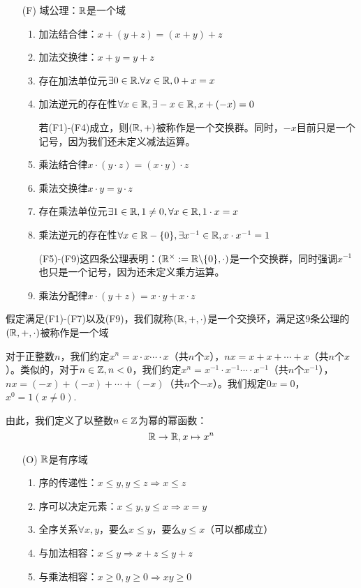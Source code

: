 \begin{itemize}
    \item[(F)] 域公理：$\mathbb{R}$是一个域
    \begin{enumerate}[(F1)]
        \item 加法结合律：$x+(y+z) = (x+y)+z$
        \item 加法交换律：$x+y=y+z$
        \item 存在加法单位元$\exists 0\in \mathbb{R}.\forall x\in \mathbb{R},0+x=x$
        \item 加法逆元的存在性$\forall x\in \mathbb{R},\exists -x\in \mathbb{R},x+(-x)=0$\\
        \begin{remark}
            若(F1)-(F4)成立，则$(\mathbb{R},+)$被称作是一个交换群。同时，$-x$目前只是一个记号，因为我们还未定义减法运算。
        \end{remark}
        \item 乘法结合律$x\cdot(y\cdot z) = (x\cdot y)\cdot z$
        \item 乘法交换律$x\cdot y = y\cdot z$
        \item 存在乘法单位元$\exists 1\in \mathbb{R},1\neq 0,\forall x\in\mathbb{R}, 1\cdot x = x$
        \item 乘法逆元的存在性$\forall x\in \mathbb{R}-\{0\},\exists x^{-1}\in \mathbb{R},x\cdot x^{-1}=1$\\
        \begin{remark}
            (F5)-(F9)这四条公理表明：$(\mathbb{R}^{\times}:=\mathbb{R}\backslash\{0\},\cdot)$是一个交换群，同时强调$x^{-1}$也只是一个记号，因为还未定义乘方运算。
        \end{remark}
        \item 乘法分配律$x\cdot(y+z) = x\cdot y+x\cdot z$
    \end{enumerate}
\end{itemize}

假定满足(F1)-(F7)以及(F9)，我们就称$(\mathbb{R},+,\cdot)$是一个交换环，满足这9条公理的$(\mathbb{R},+,\cdot)$被称作是一个域

对于正整数$n$，我们约定$x^n=x\cdot x\cdots \cdot x$（共$n$个$x$），$nx=x+x+\cdots +x$（共$n$个$x$）。类似的，对于$n\in\mathbb{Z},n<0$，我们约定$x^n=x^{-1}\cdot x^{-1}\cdots \cdot x^{-1}$（共$n$个$x^{-1}$），$nx=(-x)+(-x)+\cdots+(-x)$（共$n$个$-x$）。我们规定$0x=0$，$x^0=1(x\neq 0)$.

由此，我们定义了以整数$n\in \mathbb{Z}$为幂的幂函数：
\[\mathbb{R}\rightarrow\mathbb{R},x\mapsto x^n\]

\begin{itemize}
    \item[(O)] $\mathbb{R}$是有序域
    \begin{enumerate}[(O1)]
        \item 序的传递性：$x\leq y,y\leq z\Rightarrow x\leq z$
        \item 序可以决定元素：$x\leq y,y\leq x\Rightarrow x=y$
        \item 全序关系$\forall x,y$，要么$x\leq y$，要么$y\leq x$（可以都成立）
        \item 与加法相容：$x\leq y\Rightarrow x+z\leq y+z$
        \item 与乘法相容：$x\geq 0,y\geq 0\Rightarrow xy\geq 0$
    \end{enumerate}
\end{itemize}

